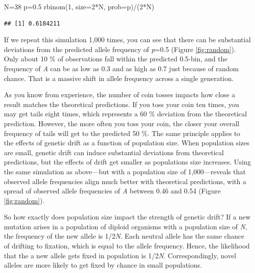 \documentclass[
]{book}
\newenvironment{Shaded}{\begin{snugshade}}{\end{snugshade}}
\newcommand{\AttributeTok}[1]{\textcolor[rgb]{0.77,0.63,0.00}{#1}}
\newcommand{\DecValTok}[1]{\textcolor[rgb]{0.00,0.00,0.81}{#1}}
\newcommand{\FloatTok}[1]{\textcolor[rgb]{0.00,0.00,0.81}{#1}}
\newcommand{\FunctionTok}[1]{\textcolor[rgb]{0.00,0.00,0.00}{#1}}
\newcommand{\NormalTok}[1]{#1}
\newcommand{\OtherTok}[1]{\textcolor[rgb]{0.56,0.35,0.01}{#1}}
\newcommand{\SpecialCharTok}[1]{\textcolor[rgb]{0.00,0.00,0.00}{#1}}
\begin{document}
\begin{Shaded}
\begin{Highlighting}[]
\NormalTok{N}\OtherTok{=}\DecValTok{38}
\NormalTok{p}\OtherTok{=}\FloatTok{0.5}
\FunctionTok{rbinom}\NormalTok{(}\DecValTok{1}\NormalTok{, }\AttributeTok{size=}\DecValTok{2}\SpecialCharTok{*}\NormalTok{N, }\AttributeTok{prob=}\NormalTok{p)}\SpecialCharTok{/}\NormalTok{(}\DecValTok{2}\SpecialCharTok{*}\NormalTok{N)}
\end{Highlighting}
\end{Shaded}

\begin{verbatim}
## [1] 0.6184211
\end{verbatim}

If we repeat this simulation 1,000 times, you can see that there can be substantial deviations from the predicted allele frequency of \emph{p}=0.5 (Figure \ref{fig:random}). Only about 10 \% of observations fall within the predicted 0.5-bin, and the frequency of \emph{A} can be as low as 0.3 and as high as 0.7 just because of random chance. That is a massive shift in allele frequency across a single generation.

As you know from experience, the number of coin tosses impacts how close a result matches the theoretical predictions. If you toss your coin ten times, you may get tails eight times, which represents a 60 \% deviation from the theoretical prediction. However, the more often you toss your coin, the closer your overall frequency of tails will get to the predicted 50 \%. The same principle applies to the effects of genetic drift as a function of population size. When population sizes are small, genetic drift can induce substantial deviations from theoretical predictions, but the effects of drift get smaller as populations size increases. Using the same simulation as above---but with a population size of 1,000---reveals that observed allele frequencies align much better with theoretical predictions, with a spread of observed allele frequencies of \emph{A} between 0.46 and 0.54 (Figure \ref{fig:random}).

So how exactly does population size impact the strength of genetic drift? If a new mutation arises in a population of diploid organisms with a population size of \emph{N}, the frequency of the new allele is 1/2\emph{N}. Each neutral allele has the same chance of drifting to fixation, which is equal to the allele frequency. Hence, the likelihood that the a new allele gets fixed in population is 1/2\emph{N}. Correspondingly, novel alleles are more likely to get fixed by chance in small populations.
\end{document}
